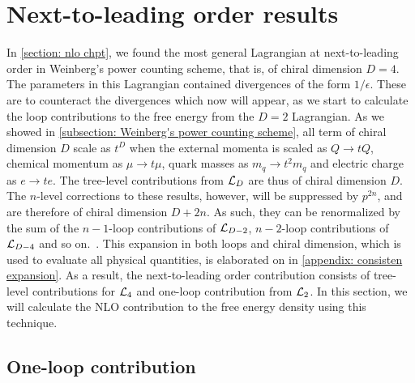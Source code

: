 \section{Next-to-leading order results}
\label{section: nlo thermodynamics}

In \autoref{section: nlo chpt}, we found the most general Lagrangian at next-to-leading order in Weinberg's power counting scheme, that is, of chiral dimension $D = 4$.
The parameters in this Lagrangian contained divergences of the form $1 / \epsilon$.
These are to counteract the divergences which now will appear, as we start to calculate the loop contributions to the free energy from the $D = 2$ Lagrangian.
As we showed in \autoref{subsection: Weinberg's power counting scheme}, all term of chiral dimension $D$ scale as $t^D$ when the external momenta is scaled as $Q\rightarrow tQ$, chemical momentum as $\mu\rightarrow t\mu$, quark masses as $m_q\rightarrow t^2 m_q$ and electric charge as $e\rightarrow t e$.
The tree-level contributions from $\mathcal{L}_D$ are thus of chiral dimension $D$.
The $n$-level corrections to these results, however, will be suppressed by $p^{2n}$, and are therefore of chiral dimension $D+2n$.
As such, they can be renormalized by the sum of the $n-1$-loop contributions of $\mathcal{L}_{D-2}$, $n-2$-loop contributions of $\mathcal{L}_{D-4}$ and so on.~\autocite{gasserChiralPerturbationTheory1984,weinbergPhenomenologicalLagrangians1979a}.
This expansion in both loops and chiral dimension, which is used to evaluate all physical quantities, is elaborated on in \autoref{appendix: consisten expansion}.
As a result, the next-to-leading order contribution consists of tree-level contributions for $\mathcal{L}_4$ and one-loop contribution from $\mathcal{L}_2$.
In this section, we will calculate the NLO contribution to the free energy density using this technique.



\subsection{One-loop contribution}

